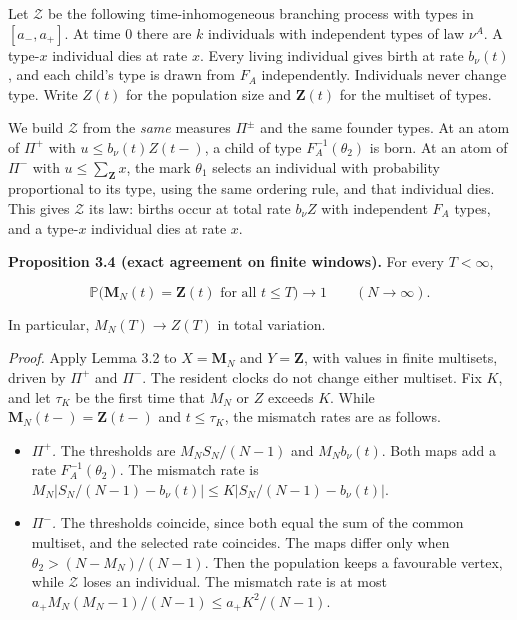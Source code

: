 \documentclass[
  british,
  11pt,
  a4paper,
]{article}
\providecommand{\tightlist}{%
  \setlength{\itemsep}{0pt}\setlength{\parskip}{0pt}}
\begin{document}
Let \(\mathcal Z\) be the following time-inhomogeneous branching process
with types in \([a_-,a_+]\). At time \(0\) there are \(k\) individuals
with independent types of law \(\nu^A\). A type-\(x\) individual dies at
rate \(x\). Every living individual gives birth at rate \(b_\nu(t)\),
and each child's type is drawn from \(F_A\) independently. Individuals
never change type. Write \(Z(t)\) for the population size and
\(\mathbf Z(t)\) for the multiset of types.

We build \(\mathcal Z\) from the \emph{same} measures \(\Pi^\pm\) and
the same founder types. At an atom of \(\Pi^+\) with
\(u\le b_\nu(t)Z(t-)\), a child of type \(F_A^{-1}(\theta_2)\) is born.
At an atom of \(\Pi^-\) with \(u\le\sum_{\mathbf Z}x\), the mark
\(\theta_1\) selects an individual with probability proportional to its
type, using the same ordering rule, and that individual dies. This gives
\(\mathcal Z\) its law: births occur at total rate \(b_\nu Z\) with
independent \(F_A\) types, and a type-\(x\) individual dies at rate
\(x\).

\textbf{Proposition 3.4 (exact agreement on finite windows).} For every
\(T<\infty\),

\[
\mathbb P\bigl(\mathbf M_N(t)=\mathbf Z(t)\text{ for all }t\le T\bigr)\longrightarrow1
\qquad(N\to\infty).
\]

In particular, \(M_N(T)\to Z(T)\) in total variation.

\emph{Proof.} Apply Lemma 3.2 to \(X=\mathbf M_N\) and \(Y=\mathbf Z\),
with values in finite multisets, driven by \(\Pi^+\) and \(\Pi^-\). The
resident clocks do not change either multiset. Fix \(K\), and let
\(\tau_K\) be the first time that \(M_N\) or \(Z\) exceeds \(K\). While
\(\mathbf M_N(t-)=\mathbf Z(t-)\) and \(t\le\tau_K\), the mismatch rates
are as follows.

\begin{itemize}
\tightlist
\item
  \emph{\(\Pi^+\).} The thresholds are \(M_NS_N/(N-1)\) and
  \(M_Nb_\nu(t)\). Both maps add a rate \(F_A^{-1}(\theta_2)\). The
  mismatch rate is \(M_N|S_N/(N-1)-b_\nu(t)|\le K|S_N/(N-1)-b_\nu(t)|\).
\item
  \emph{\(\Pi^-\).} The thresholds coincide, since both equal the sum of
  the common multiset, and the selected rate coincides. The maps differ
  only when \(\theta_2>(N-M_N)/(N-1)\). Then the population keeps a
  favourable vertex, while \(\mathcal Z\) loses an individual. The
  mismatch rate is at most \(a_+M_N(M_N-1)/(N-1)\le a_+K^2/(N-1)\).
\end{itemize}
\end{document}
